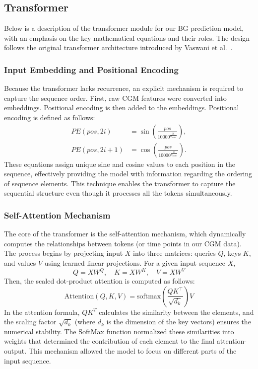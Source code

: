\subsection*{Transformer}
Below is a description of the transformer module for our BG prediction model, with an emphasis on the key mathematical equations and their roles. The design follows the original transformer architecture introduced by Vaswani et al.~\cite{2611532:32775701}.

\subsubsection*{Input Embedding and Positional Encoding}
Because the transformer lacks recurrence, an explicit mechanism is required to capture the sequence order. First, raw CGM features were converted into embeddings. Positional encoding is then added to the embeddings. Positional encoding is defined as follows:
\begin{equation}
\begin{aligned}
PE(pos,2i) &= \sin\left(\frac{pos}{10000^{\frac{2i}{d_{model}}}}\right), \\
PE(pos,2i+1) &= \cos\left(\frac{pos}{10000^{\frac{2i}{d_{model}}}}\right).
\end{aligned}
\label{dfg-f4f692ad5a04}
\end{equation}
These equations assign unique sine and cosine values to each position in the sequence, effectively providing the model with information regarding the ordering of sequence elements. This technique enables the transformer to capture the sequential structure even though it processes all the tokens simultaneously.

\subsubsection*{Self-Attention Mechanism}
The core of the transformer is the self-attention mechanism, which dynamically computes the relationships between tokens (or time points in our CGM data). The process begins by projecting input \( X \) into three matrices: queries \( Q \), keys \( K \), and values \( V \) using learned linear projections. For a given input sequence \( X \),
\begin{equation}
Q = XW^{Q}, \quad K = XW^{K}, \quad V = XW^{V}
\label{dfg-83d7e7682db6}
\end{equation}
Then, the scaled dot-product attention is computed as follows:
\begin{equation}
\text{Attention}(Q, K, V) = \text{softmax}\left(\frac{QK^\top}{\sqrt{d_k}}\right)V
\label{dfg-6425043c282f}
\end{equation}
In the attention formula, \( QK^{T} \) calculates the similarity between the elements, and the scaling factor \( \sqrt{d_k} \) (where \( d_k \) is the dimension of the key vectors) ensures the numerical stability. The SoftMax function normalized these similarities into weights that determined the contribution of each element to the final attention-output. This mechanism allowed the model to focus on different parts of the input sequence.

